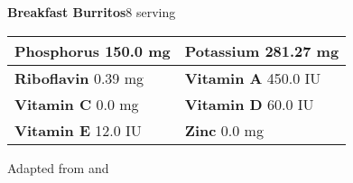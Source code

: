 \documentclass[../recipe-collections/cooking.tex]{subfiles}
\begin{document}
\begin{recipe}{\textbf{Breakfast Burritos}}{8 serving}{}
\begin{tabular}{|lr|}
      \textbf{Phosphorus} \textrm{ 150.0  mg}   &
      \multicolumn{1}{|l|}{\textbf{Potassium} \textrm{ 281.27  mg}}     \\ \hline
      \textbf{Riboflavin} \textrm{ 0.39  mg}  &
      \multicolumn{1}{|l|}{\textbf{Vitamin A} \textrm{ 450.0 IU }}        \\ \hline
      \textbf{Vitamin C} \textrm{ 0.0  mg}      &
      \multicolumn{1}{|l|}{\textbf{Vitamin D} \textrm{ 60.0  IU}}         \\ \hline
      \textbf{Vitamin E} \textrm{ 12.0  IU}     &
      \multicolumn{1}{|l|}{\textbf{Zinc} \textrm{ 0.0  mg}}               \\ \hline
  \end{tabular}

  \freeform{}\hrulefill{}

\end{recipe}

Adapted from  
\autocite{Pillsbury_BreakfastBurritos_2021} and
\autocite{MirlandrasKitchen_HashBrowns_2017}
\end{document}

